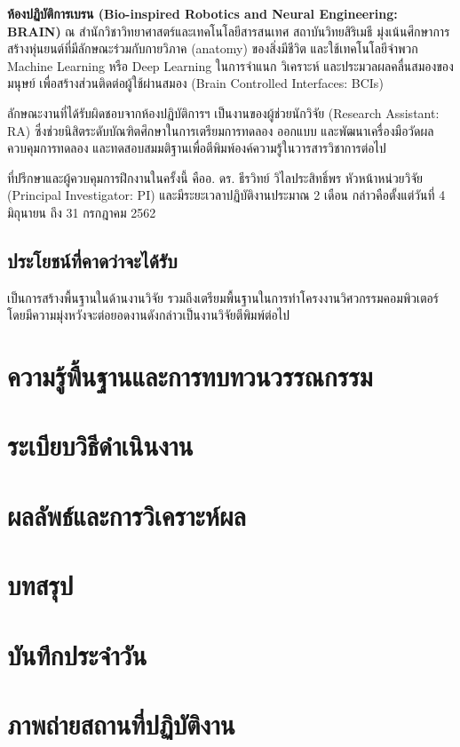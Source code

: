 \documentclass[16pt,a4]{internshipreport}
\begin{document}
\textbf{ห้องปฏิบัติการเบรน (Bio-inspired Robotics and Neural Engineering: BRAIN)}
ณ สำนักวิชาวิทยาศาสตร์และเทคโนโลยีสารสนเทศ สถาบันวิทยสิริเมธี มุ่งเน้นศึกษาการสร้างหุ่นยนต์ที่มีลักษณะร่วมกับกายวิภาค (anatomy) ของสิ่งมีชีวิต และใช้เทคโนโลยีจำพวก Machine Learning หรือ Deep Learning ในการจำแนก วิเคราะห์ และประมวลผลคลื่นสมองของมนุษย์ เพื่อสร้างส่วนติดต่อผู้ใช้ผ่านสมอง (Brain Controlled Interfaces: BCIs)

ลักษณะงานที่ได้รับผิดชอบจากห้องปฏิบัติการฯ เป็นงานของผู้ช่วยนักวิจัย (Research Assistant: RA) ซึ่งช่วยนิสิตระดับบัณฑิตศึกษาในการเตรียมการทดลอง ออกแบบ และพัฒนาเครื่องมือวัดผล ควบคุมการทดลอง และทดสอบสมมติฐานเพื่อตีพิมพ์องค์ความรู้ในวารสารวิชาการต่อไป

ที่ปรึกษาและผู้ควบคุมการฝึกงานในครั้งนี้ คืออ. ดร. ธีรวิทย์ วิไลประสิทธิ์พร หัวหน้าหน่วยวิจัย (Principal Investigator: PI) และมีระยะเวลาปฏิบัติงานประมาณ 2 เดือน กล่าวคือตั้งแต่วันที่ 4 มิถุนายน ถึง 31 กรกฎาคม 2562

\section{ประโยชน์ที่คาดว่าจะได้รับ}
เป็นการสร้างพื้นฐานในด้านงานวิจัย รวมถึงเตรียมพื้นฐานในการทำโครงงานวิศวกรรมคอมพิวเตอร์ โดยมีความมุ่งหวังจะต่อยอดงานดังกล่าวเป็นงานวิจัยตีพิมพ์ต่อไป

\chapter{ความรู้พื้นฐานและการทบทวนวรรณกรรม}




\chapter{ระเบียบวิธีดำเนินงาน}


\chapter{ผลลัพธ์และการวิเคราะห์ผล}


\chapter{บทสรุป}




\begin{appendices}
\chapter{บันทึกประจำวัน}


\chapter{ภาพถ่ายสถานที่ปฏิบัติงาน}

\end{appendices}
\end{document}
